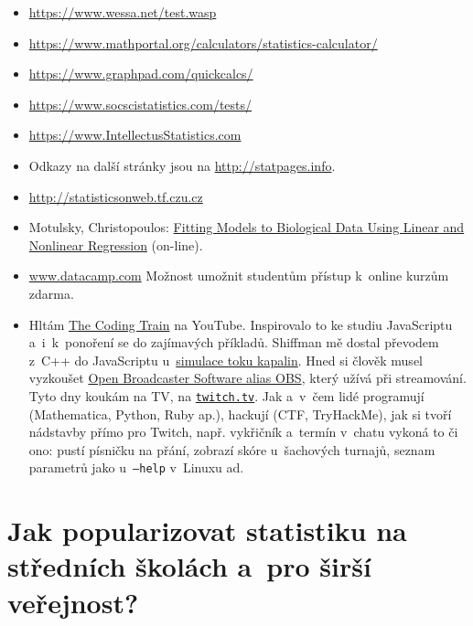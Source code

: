 \begin{itemize}
\item \href{https://www.wessa.net/test.wasp}{\url{https://www.wessa.net/test.wasp}}
\item \href{https://www.mathportal.org/calculators/statistics-calculator/}{\url{https://www.mathportal.org/calculators/statistics-calculator/}}
\item \href{https://www.graphpad.com/quickcalcs/}{\url{https://www.graphpad.com/quickcalcs/}}
\item \href{https://www.socscistatistics.com/tests/}{\url{https://www.socscistatistics.com/tests/}}
\item \href{https://www.IntellectusStatistics.com}{\url{https://www.IntellectusStatistics.com}}
\item Odkazy na další stránky jsou na \href{http://statpages.info}{\url{http://statpages.info}}.
\item \href{http://statisticsonweb.tf.czu.cz}{\url{http://statisticsonweb.tf.czu.cz}}
\malskok

\item Motulsky, Christopoulos: \href{https://www.facm.ucl.ac.be/intranet/books/statistics/Prism-Regression-Book.unlocked.pdf}{Fitting Models to Biological Data Using Linear and Nonlinear Regression} (on-line).
\malskok

\item \href{https://www.datacamp.com/}{\url{www.datacamp.com}} Možnost umožnit studentům přístup k~online kurzům zdarma.
\malskok

\item Hltám \href{https://www.youtube.com/user/shiffman}{The Coding Train} na YouTube. Inspirovalo to ke studiu Java\-Scriptu a~i~k~ponoření se do zajímavých příkladů. Shiffman mě dostal převodem z~C++ do JavaScriptu u~\href{https://www.youtube.com/watch?v=alhpH6ECFvQ}{simulace toku kapalin}. Hned si člověk musel vyzkoušet \href{https://obsproject.com/}{Open Broadcaster Software alias OBS}, který užívá při streamování. Tyto dny koukám na TV, na \href{https://www.twitch.tv/}{\tt twitch.tv}. Jak a~v~čem lidé programují (Mathematica, Python, Ruby ap.), hackují (CTF, TryHackMe), jak si tvoří nádstavby přímo pro Twitch, např. vykřičník a~termín v~chatu vykoná to či ono: pustí písničku na přání, zobrazí skóre u~šachových turnajů, seznam parametrů jako u~{\tt--help} v~Linuxu ad.
\maljadro
\end{itemize}



\section{Jak popularizovat statistiku na středních školách a~pro širší veřejnost?}
\smallskip

